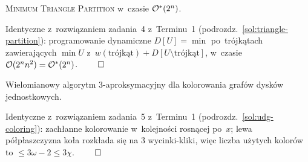 \clearpage
\begin{zadanie}
	\textsc{Minimum Triangle Partition} w~czasie $\mathcal{O}^*(2^n)$.
\end{zadanie}

Identyczne z~rozwiązaniem zadania~4 z~Terminu~1
(podrozdz.~\ref{sol:triangle-partition}): programowanie dynamiczne
$D[U]=\min$ po~trójkątach zawierających $\min U$ z~$w(\text{trójkąt})+D[U\setminus
\text{trójkąt}]$, w~czasie $\mathcal{O}(2^n n^2)=\mathcal{O}^*(2^n)$. $\qed$

\clearpage
\begin{zadanie}
	Wielomianowy algorytm $3$-aproksymacyjny dla kolorowania grafów dysków
	jednostkowych.
\end{zadanie}

Identyczne z~rozwiązaniem zadania~5 z~Terminu~1
(podrozdz.~\ref{sol:udg-coloring}): zachłanne kolorowanie w~kolejności rosnącej
po~$x$; lewa półpłaszczyzna koła rozkłada się na $3$ wycinki-kliki, więc liczba
użytych kolorów to $\le 3\omega-2\le 3\chi$. $\qed$
